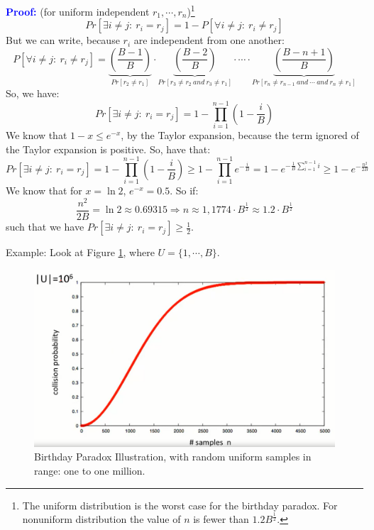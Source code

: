 \documentclass[12pt]{book}
\newcommand{\Proof}{\textcolor{blue}{\textbf{Proof:}} }
\begin{document}
\Proof (for uniform independent $r_{1},\cdots,r_{n}$)\footnote{The uniform distribution is the worst case for the birthday paradox. For nonuniform distribution the value of $n$ is fewer than $1.2 B^{\frac{1}{2}}$.}
$$Pr[\exists i\neq j:\ r_{i}=r_{j}]=1-P[\forall i\neq j:\ r_{i}\neq r_{j}]$$But we can write, because $r_{i}$ are independent from one another:
$$P[\forall i\neq j:\ r_{i}\neq r_{j}]=\underbrace{\left(\frac{B-1}{B}\right)}_{Pr[r_{2}\neq r_{1}]}\cdot \underbrace{\left(\frac{B-2}{B}\right)}_{Pr[r_{3}\neq r_{2}\ and\ r_{3}\neq r_{1}]}\cdot\cdots\cdot \underbrace{\left(\frac{B-n+1}{B}\right)}_{Pr[r_{n}\neq r_{n-1}\ and\ \cdots\ and\ r_{n}\neq r_{1}]}$$So, we have:
$$Pr[\exists i\neq j:\ r_{i}=r_{j}]=1-\prod\limits_{i=1}^{n-1}\left(1-\frac{i}{B}\right)$$We know that $1-x\leq e^{-x}$, by the Taylor expansion, because the term ignored of the Taylor expansion is positive. So, have that:
$$Pr[\exists i\neq j:\ r_{i}=r_{j}]=1-\prod\limits_{i=1}^{n-1}\left(1-\frac{i}{B}\right)\geq 1-\prod\limits_{i=1}^{n-1}e^{-\frac{i}{B}}=1-e^{-\frac{1}{B}\sum\limits_{i=1}^{n-1}i}\geq 1-e^{-\frac{n^{2}}{2B}}$$We know that for $x=\ln 2$, $e^{-x}=0.5$. So if:
$$\frac{n^{2}}{2B}=\ln 2\approx0.69315\Rightarrow n\approx1,1774\cdot B^{\frac{1}{2}}\approx1.2\cdot B^{\frac{1}{2}}$$such that we have $Pr[\exists i\neq j:\ r_{i}=r_{j}]\geq \frac{1}{2}$.

Example: Look at Figure \ref{fig:birthday_paradox1}, where $U=\{1,\cdots,B\}$.
\begin{figure}[h]
	\centering
	\includegraphics[width=.7\textwidth]{birthday_paradox}
	\caption{Birthday Paradox Illustration, with random uniform samples in range: one to one million.}
	\label{fig:birthday_paradox1}
\end{figure}
\end{document}
